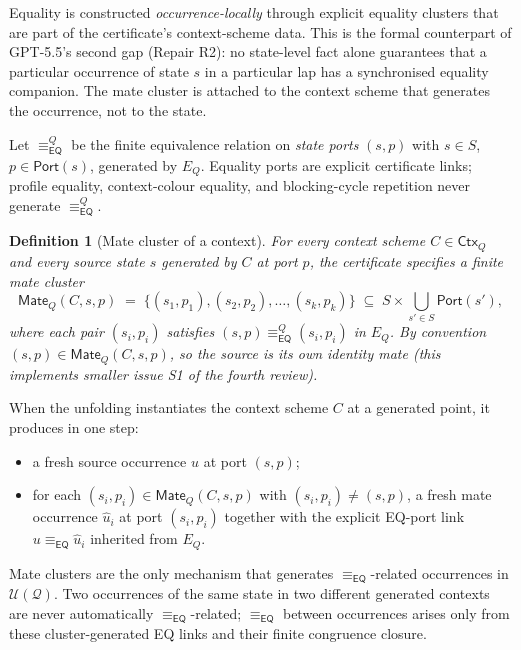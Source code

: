 \documentclass[11pt]{article}
\newtheorem{definition}[theorem]{Definition}
\newcommand{\EQ}{\mathsf{EQ}}
\newcommand{\Q}{\mathcal Q}
\newcommand{\U}{\mathcal U}
\newcommand{\Ctx}{\mathsf{Ctx}}
\newcommand{\Port}{\mathsf{Port}}
\newcommand{\Mate}{\mathsf{Mate}}
\newcommand{\eqc}{\equiv_{\EQ}}
\begin{document}
Equality is constructed \emph{occurrence-locally} through explicit
equality clusters that are part of the certificate's context-scheme
data.  This is the formal counterpart of GPT-5.5's second gap
(Repair R2): no state-level fact alone guarantees that a particular
occurrence of state $s$ in a particular lap has a synchronised
equality companion.  The mate cluster is attached to the context
scheme that generates the occurrence, not to the state.

Let $\eqc^{Q}$ be the finite equivalence relation on \emph{state
ports} $(s,p)$ with $s\in S$, $p\in\Port(s)$, generated by $E_Q$.
Equality ports are explicit certificate links; profile equality,
context-colour equality, and blocking-cycle repetition never
generate $\eqc^{Q}$.

\begin{definition}[Mate cluster of a context]\label{def:mate-cluster}
For every context scheme $C\in\Ctx_Q$ and every source state $s$
generated by $C$ at port $p$, the certificate specifies a finite
\emph{mate cluster}
\[
  \Mate_Q(C,s,p)\;=\;\{(s_1,p_1),(s_2,p_2),\ldots,(s_k,p_k)\}
  \;\subseteq\;S\times\bigcup_{s'\in S}\Port(s'),
\]
where each pair $(s_i,p_i)$ satisfies $(s,p)\eqc^{Q}(s_i,p_i)$ in
$E_Q$.  By convention $(s,p)\in\Mate_Q(C,s,p)$, so the source is
its own identity mate (this implements smaller issue S1 of the
fourth review).
\end{definition}

When the unfolding instantiates the context scheme $C$ at a
generated point, it produces in one step:
\begin{itemize}
\item a fresh source occurrence $u$ at port $(s,p)$;
\item for each $(s_i,p_i)\in\Mate_Q(C,s,p)$ with $(s_i,p_i)\neq
(s,p)$, a fresh mate occurrence $\widehat u_i$ at port $(s_i,p_i)$
together with the explicit EQ-port link $u\eqc\widehat u_i$
inherited from $E_Q$.
\end{itemize}
Mate clusters are the only mechanism that generates $\eqc$-related
occurrences in $\U(\Q)$.  Two occurrences of the same state in two
different generated contexts are never automatically $\eqc$-related;
$\eqc$ between occurrences arises only from these cluster-generated
EQ links and their finite congruence closure.
\end{document}
